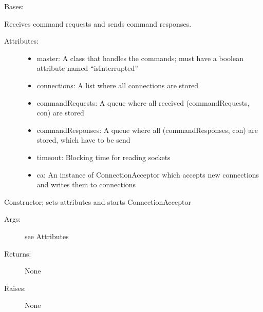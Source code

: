 \documentclass[letterpaper,10pt,english]{sphinxmanual}
\begin{document}
\begin{fulllineitems}
\label{communicationUtilities:communicationUtilities.CommandReceiver}
Bases: 

Receives command requests and sends command responses.
\begin{description}
\item[{Attributes:}] \leavevmode\begin{itemize}
\item {} 
master: A class that handles the commands; must have a boolean attribute named ``isInterrupted''

\item {} 
connections: A list where all connections are stored

\item {} 
commandRequests: A queue where all received (commandRequests, con) are stored

\item {} 
commandResponses: A queue where all (commandResponses, con) are stored, which have to be send

\item {} 
timeout: Blocking time for reading sockets

\item {} 
ca: An instance of ConnectionAcceptor which accepts new connections and writes them to connections

\end{itemize}

\end{description}

\begin{fulllineitems}
\label{communicationUtilities:communicationUtilities.CommandReceiver.__init__}
Constructor; sets attributes and starts ConnectionAcceptor
\begin{description}
\item[{Args:}] \leavevmode
see Attributes

\item[{Returns:}] \leavevmode
None

\item[{Raises:}] \leavevmode
None


\end{description}
\end{fulllineitems}
\end{fulllineitems}
\end{document}
